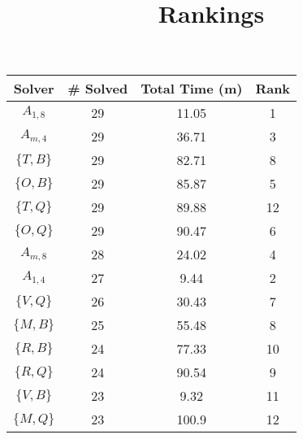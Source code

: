 \documentclass{article}
\title{Rankings}
\begin{document}
\maketitle

\begin{table}[ht!]
\centering

\begin{tabular}{|c||c|c||c|}\hline
Solver   & \# Solved & Total Time (m) & Rank \\\hline\hline
$A_{1,8}$   &  29    &  11.05   & 1\\\hline
$A_{m,4}$   &  29    &  36.71   & 3\\\hline
$\{T, B\}$  &  29    &  82.71   & 8\\\hline
$\{O, B\}$  &  29    &  85.87   & 5\\\hline
$\{T, Q\}$  &  29    &  89.88   & 12\\\hline
$\{O, Q\}$  &  29    &  90.47   & 6\\\hline
$A_{m,8}$   &  28    &  24.02   & 4\\\hline
$A_{1,4}$   &  27    &  9.44   & 2\\\hline
$\{V, Q\}$  &  26    &  30.43   & 7\\\hline
$\{M, B\}$  &  25    &  55.48   & 8\\\hline
$\{R, B\}$  &  24    &  77.33   & 10\\\hline
$\{R, Q\}$  &  24    &  90.54   & 9\\\hline
$\{V, B\}$  &  23    &  9.32   & 11\\\hline
$\{M, Q\}$  &  23    &  100.9   & 12\\\hline
\end{tabular}
\end{table}
\end{document}
